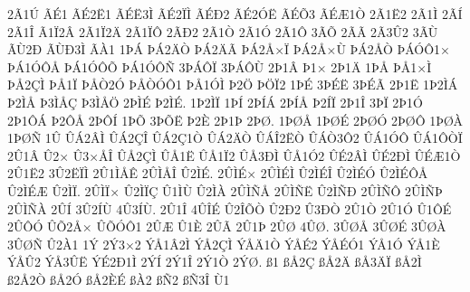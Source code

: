 {2^^c31^^da
^^c3^^c91
^^c3^^c92^^cb1
^^c3^^c9^^cb3^^cc
^^c3^^c92^^cf^^cc
^^c3^^c9^^d02
^^c3^^c92^^d3^^cb
^^c3^^c9^^d53
^^c3^^c9^^c61^^d2
2^^c31^^cb2
2^^c31^^cc
2^^c3^^cd
2^^c31^^ce
^^c31^^cf2^^c2
2^^c31^^cf2^^c4
2^^c31^^cf^^d4
2^^c3^^d02
2^^c31^^d2
2^^c31^^d3
2^^c31^^d4
3^^c3^^d5
2^^c3^^c3
2^^c33^^db2
3^^c3^^d9
^^c3^^d92^^d0
^^c3^^d9^^d03^^cc
^^c3^^c01
1^^de^^c1
^^de^^c12^^c4^^d2
^^de^^c12^^c4^^c3
^^de^^c12^^c5^^d7^^cf
^^de^^c12^^c5^^d7^^d9
^^de^^c12^^c5^^d2
^^de^^c1^^d3^^d41^^d7
^^de^^c11^^d3^^d4^^c5
^^de^^c11^^d3^^d4^^d5
^^de^^c11^^d3^^d4^^d1
3^^de^^c1^^d4^^cf
3^^de^^c1^^d4^^d9
2^^de1^^c2
^^de1^^d7
2^^de1^^c4
1^^de^^c5
^^de^^c51^^d7^^cc
^^de^^c52^^c7^^cc
^^de^^c51^^cf
^^de^^c5^^d22^^d3
^^de^^c5^^d2^^d3^^d41
^^de^^c51^^d3^^cc
^^de2^^d6
^^de^^d6^^cf2
1^^de^^c9
3^^de^^c9^^cb
3^^de^^c9^^c3
2^^de1^^cb
1^^de2^^cc^^c1
^^de2^^cc^^c5
^^de3^^cc^^c5^^c7
^^de3^^cc^^c5^^d6
2^^de^^cc^^c9
^^de2^^cc^^c9.
1^^de2^^cc^^cf
1^^de^^cd
2^^de^^cd^^c1
2^^de^^cd^^c5
^^de2^^cd^^cf
2^^de1^^ce
3^^de^^cf
2^^de1^^d3
2^^de1^^d4^^c1
^^de2^^d4^^c5
2^^de^^d4^^cd
1^^de^^d5
3^^de^^d5^^cb
^^de2^^c8
2^^de1^^de
2^^de^^d8.
1^^de^^d8^^c5
1^^de^^d8^^c9
2^^de^^d8^^d3
2^^de^^d8^^d4
1^^de^^d8^^c0
1^^de^^d8^^d1
1^^db
^^db^^c12^^c2^^cc
^^db^^c12^^c7^^ce
^^db^^c12^^c71^^d2
^^db^^c12^^c4^^d2
^^db^^c1^^ce2^^cb^^d2
^^db^^c1^^d23^^d42
^^db^^c11^^d3^^d4
^^db^^c11^^d4^^d2^^cf
2^^db1^^c2
^^db2^^d7
^^db3^^d7^^c5^^ce
^^db^^c52^^c7^^cc
^^db^^c51^^cb
^^db^^c51^^cf2
^^db^^c53^^d0^^cc
^^db^^c51^^d32
^^db^^c92^^c2^^cc
^^db^^c92^^d0^^cc
^^db^^c9^^c61^^d2
2^^db1^^cb2
3^^db2^^cb^^cf^^cc
2^^db1^^cc^^c5^^ca
2^^db^^cc^^c5^^ce
^^db2^^cc^^c9.
2^^db^^cc^^c9^^d7
2^^db^^cc^^c9^^cc
^^db2^^cc^^c9^^ce
^^db2^^cc^^c9^^d3
^^db2^^cc^^c9^^d4^^c5
^^db2^^cc^^c9^^c6
^^db2^^cc^^cf.
2^^db^^cc^^cf^^d7
^^db2^^cc^^cf^^c7
^^db1^^cc^^d9
^^db2^^cc^^c0
2^^db^^cc^^d1^^c5
2^^db^^cc^^d1^^cb
^^db2^^cc^^d1^^d0
2^^db^^cc^^d1^^d4
2^^db^^cc^^d1^^de
2^^db^^cc^^d1^^c0
2^^db^^cd
3^^db2^^cd^^d9
4^^db3^^cd^^d9.
2^^db1^^ce
4^^db^^ce^^c9
^^db2^^ce^^d5^^d2
^^db2^^d02
^^db3^^d0^^d2
2^^db1^^d2
2^^db1^^d3
^^db1^^d4^^c9
2^^db^^d4^^d3
^^db^^d52^^c5^^d7
^^db^^d5^^d3^^d41
2^^db^^c6
^^db1^^c8
2^^db^^c3
2^^db1^^de
2^^db^^d8
4^^db^^d8.
3^^db^^d8^^c5
3^^db^^d8^^c9
3^^db^^d8^^c0
3^^db^^d8^^d1
^^db2^^c01
1^^dd
2^^dd3^^d72
^^dd^^c51^^c22^^cc
^^dd^^c52^^c7^^cc
^^dd^^c5^^c41^^d2
^^dd^^c5^^c92
^^dd^^c5^^c9^^d31
^^dd^^c51^^d3
^^dd^^c51^^c8
^^dd^^c5^^db2
^^dd^^c53^^db^^cb
^^dd^^c92^^d01^^cc
2^^dd^^cd
2^^dd1^^ce
2^^dd1^^d2
2^^dd^^d8.
^^df1
^^df^^c52^^c7
^^df^^c52^^c4
^^df^^c53^^c4^^cf
^^df^^c52^^cc
^^df2^^c52^^d2
^^df^^c52^^d3
^^df^^c52^^c8^^c9
^^df^^c02
^^df^^d12
^^df^^d13^^ce
^^d91
}
